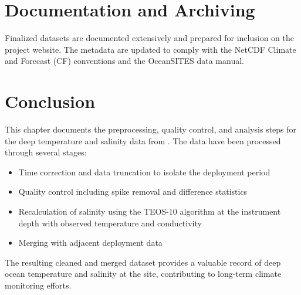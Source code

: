 \section{Documentation and Archiving}
Finalized datasets are documented extensively and prepared for inclusion on the project website. 
The metadata are updated to comply with the NetCDF Climate and Forecast (CF) conventions and the OceanSITES data manual.

\section{Conclusion}
This chapter documents the preprocessing, quality control, and analysis steps 
for the deep temperature and salinity data from \projectname{} \casenumber{}. 
The data have been processed through several stages:

\begin{itemize}
    \item Time correction and data truncation to isolate the deployment period
    \item Quality control including spike removal and difference statistics
    \item Recalculation of salinity using the TEOS-10 algorithm at the instrument depth with observed temperature and conductivity
    \item Merging with adjacent deployment data %
\end{itemize}

The resulting cleaned and merged dataset provides a valuable record of deep ocean temperature and salinity 
at the \projectname{} site, contributing to long-term climate monitoring efforts.
